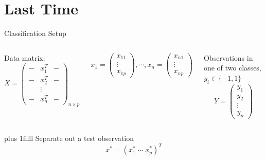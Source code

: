 \documentclass[aspectratio=169,usenames,dvipsnames]{beamer}
\newcommand{\bvfill}{\vskip0pt plus 1filll}
\begin{document}
\section{Last Time}

\begin{frame}[t]{Classification Setup}

\begin{columns}
\centering
 Data matrix:
	\begin{equation*}
		X =
		\begin{pmatrix}
			- & x_1^T & -\\
			- & x_2^T & -\\
			 & \vdots & \\
			- & x_n^T & -
		\end{pmatrix}_{n \times p}
	\end{equation*}

	\begin{equation*}
		x_1 =
		\begin{pmatrix}
			x_{11} \\
			\vdots \\
			x_{1p}
		\end{pmatrix}
		,\cdots,
		x_n =
		\begin{pmatrix}
			x_{n1} \\
			\vdots \\
			x_{np}
		\end{pmatrix}
	\end{equation*}

\centering
 Observations in one of two classes, $y_i \in \{-1,1\}$
	\begin{equation*}
		Y =
		\begin{pmatrix}
			y_1 \\
			y_2\\
			\vdots \\
			y_n
		\end{pmatrix}
	\end{equation*}



\end{columns}
\bvfill
\centering
Separate out a test observation
\begin{equation*}
	x^* = (x_1^* \; \cdots \; x^*_p)^T
\end{equation*}
\end{frame}
\end{document}
